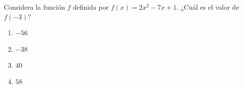 \begin{problem}
    Considera la función $f$ definida por $f(x) = 2x^2 - 7x + 1$. ¿Cuál es el valor de $f(-3)$?

    \begin{enumerate}[label=\Alph*.]
        \item $-56$
        \item $-38$
        \item $40$
        \item $58$
    \end{enumerate}
\end{problem}
